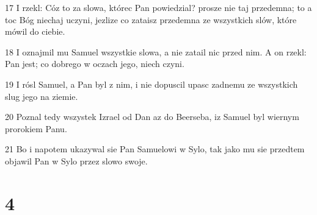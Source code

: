 \par 17 I rzekl: Cóz to za slowa, którec Pan powiedzial? prosze nie taj przedemna; to a toc Bóg niechaj uczyni, jezlize co zataisz przedemna ze wszystkich slów, które mówil do ciebie.
\par 18 I oznajmil mu Samuel wszystkie slowa, a nie zatail nic przed nim. A on rzekl: Pan jest; co dobrego w oczach jego, niech czyni.
\par 19 I rósl Samuel, a Pan byl z nim, i nie dopuscil upasc zadnemu ze wszystkich slug jego na ziemie.
\par 20 Poznal tedy wszystek Izrael od Dan az do Beerseba, iz Samuel byl wiernym prorokiem Panu.
\par 21 Bo i napotem ukazywal sie Pan Samuelowi w Sylo, tak jako mu sie przedtem objawil Pan w Sylo przez slowo swoje.

\chapter{4}

